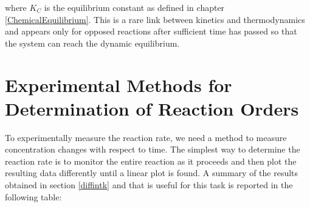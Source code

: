 \documentclass[
  9pt,
]{extbook}
\theoremstyle{definition}
\theoremstyle{definition}
\theoremstyle{definition}
\theoremstyle{remark}
\begin{document}
where \(K_C\) is the equilibrium constant as defined in chapter \ref{ChemicalEquilibrium}. This is a rare link between kinetics and thermodynamics and appears only for opposed reactions after sufficient time has passed so that the system can reach the dynamic equilibrium.

\hypertarget{experimental-methods-for-determination-of-reaction-orders}{%
\section{Experimental Methods for Determination of Reaction Orders}\label{experimental-methods-for-determination-of-reaction-orders}}

To experimentally measure the reaction rate, we need a method to measure concentration changes with respect to time. The simplest way to determine the reaction rate is to monitor the entire reaction as it proceeds and then plot the resulting data differently until a linear plot is found. A summary of the results obtained in section \ref{diffintk} and that is useful for this task is reported in the following table:

\scriptsize
\end{document}

